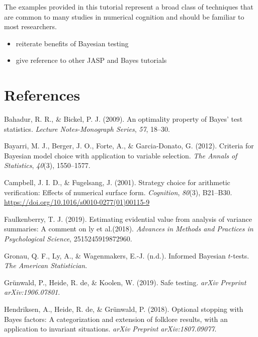 \documentclass[english,,doc,floatsintext]{apa6}
\providecommand{\tightlist}{%
  \setlength{\itemsep}{0pt}\setlength{\parskip}{0pt}}
\begin{document}
The examples provided in this tutorial represent a broad class of techniques that are common to many studies in numerical cognition and should be familiar to most researchers.

\begin{itemize}
\tightlist
\item
  reiterate benefits of Bayesian testing
\item
  give reference to other JASP and Bayes tutorials
\end{itemize}

\newpage

\hypertarget{references}{%
\section{References}\label{references}}

\setlength{\parindent}{-0.5in}
\setlength{\leftskip}{0.5in}

\hypertarget{refs}{}
\leavevmode\hypertarget{ref-bahadur2009optimality}{}%
Bahadur, R. R., \& Bickel, P. J. (2009). An optimality property of Bayes' test statistics. \emph{Lecture Notes-Monograph Series}, \emph{57}, 18--30.

\leavevmode\hypertarget{ref-bayarri2012criteria}{}%
Bayarri, M. J., Berger, J. O., Forte, A., \& Garcia-Donato, G. (2012). Criteria for Bayesian model choice with application to variable selection. \emph{The Annals of Statistics}, \emph{40}(3), 1550--1577.

\leavevmode\hypertarget{ref-campbellFugelsang2001}{}%
Campbell, J. I. D., \& Fugelsang, J. (2001). Strategy choice for arithmetic verification: Effects of numerical surface form. \emph{Cognition}, \emph{80}(3), B21--B30. \url{https://doi.org/10.1016/s0010-0277(01)00115-9}

\leavevmode\hypertarget{ref-faulkenberry2019estimating}{}%
Faulkenberry, T. J. (2019). Estimating evidential value from analysis of variance summaries: A comment on ly et al.(2018). \emph{Advances in Methods and Practices in Psychological Science}, 2515245919872960.

\leavevmode\hypertarget{ref-gronauInpressinformed}{}%
Gronau, Q. F., Ly, A., \& Wagenmakers, E.-J. (n.d.). Informed Bayesian \(t\)-tests. \emph{The American Statistician}.

\leavevmode\hypertarget{ref-grunwald2019safe}{}%
Grünwald, P., Heide, R. de, \& Koolen, W. (2019). Safe testing. \emph{arXiv Preprint arXiv:1906.07801}.

\leavevmode\hypertarget{ref-hendriksen2018optional}{}%
Hendriksen, A., Heide, R. de, \& Grünwald, P. (2018). Optional stopping with Bayes factors: A categorization and extension of folklore results, with an application to invariant situations. \emph{arXiv Preprint arXiv:1807.09077}.
\end{document}
